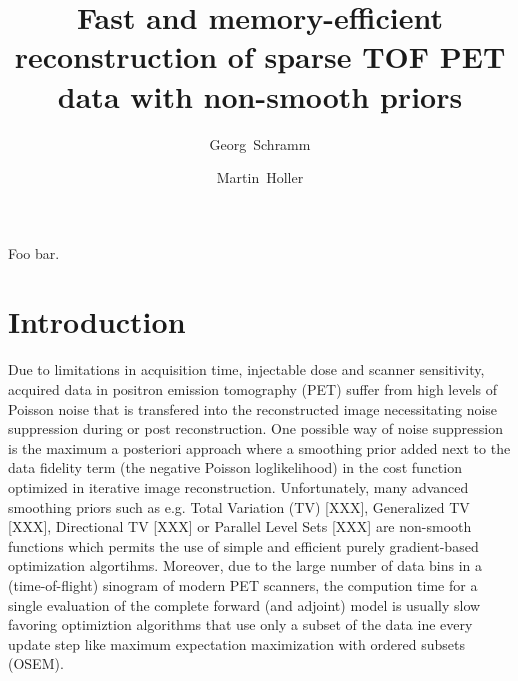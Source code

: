 \documentclass[11pt,twocolumn,twoside]{article}
\begin{document}
\title{Fast and memory-efficient reconstruction of sparse TOF PET data with non-smooth priors} 

\author[1]{Georg~Schramm}
\author[2]{Martin~Holler}



\maketitle
\thispagestyle{fancy}





\begin{customabstract}
Foo bar.
\end{customabstract}


\section{Introduction}

Due to limitations in acquisition time, injectable dose and scanner sensitivity,
acquired data in positron emission tomography (PET) suffer from high levels of
Poisson noise that is transfered into the reconstructed image necessitating
noise suppression during or post reconstruction.
One possible way of noise suppression is the maximum a posteriori approach
where a smoothing prior added next to the data fidelity term (the negative
Poisson loglikelihood) in the cost function optimized in iterative image 
reconstruction.
Unfortunately, many advanced smoothing priors such as e.g. Total Variation (TV) [XXX],
Generalized TV [XXX], Directional TV [XXX] or Parallel Level Sets [XXX] are non-smooth 
functions which permits the use of simple and efficient purely gradient-based
optimization algortihms.
Moreover, due to the large number of data bins in a (time-of-flight) sinogram
of modern PET scanners, the compution time for a single evaluation of the complete
forward (and adjoint) model is usually slow favoring optimiztion algorithms that
use only a subset of the data ine every update step like maximum expectation maximization
with ordered subsets (OSEM).
\end{document}
